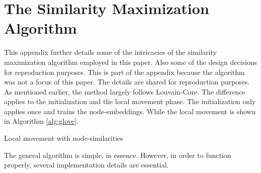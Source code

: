 \documentclass[11pt, twocolumn]{article}
\begin{document}
\section{The Similarity Maximization Algorithm}
This appendix further details some of the intricacies of the similarity maximization algorithm employed in this paper. Also some of the design decisions for reproduction purposes. This is part of the appendix because the algorithm was not a focus of this paper. The details are shared for reproduction purposes. As mentioned earlier, the method largely follows Louvain-Core. The difference applies to the initialization and the local movement phase. The initialization only applies once and trains the node-embeddings. While the local movement is shown in Algorithm \autoref{alg:glove}.
\begin{algorithm*}[htb]
\label{alg:glove}
\SetAlgoLined
{}


\caption{Local movement with node-similarities}
\end{algorithm*}
The general algorithm is simple, in essence. However, in order to function properly, several implementation details are essential. 
\end{document}
